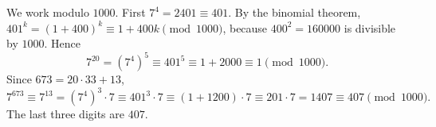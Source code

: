 We work modulo $1000$. First $7^4=2401\equiv401$. By the binomial theorem, $401^k=(1+400)^k\equiv1+400k\pmod{1000}$, because $400^2=160000$ is divisible by $1000$. Hence
\[
7^{20}=\left(7^4\right)^5\equiv401^5\equiv1+2000\equiv1\pmod{1000}.
\]
Since $673=20\cdot33+13$,
\[
7^{673}\equiv7^{13}=\left(7^4\right)^3\cdot7\equiv401^3\cdot7\equiv(1+1200)\cdot7\equiv201\cdot7=1407\equiv407\pmod{1000}.
\]
The last three digits are $\boxed{407}$.
